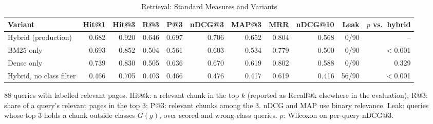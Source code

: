 \begin{table}[t]
\centering
\caption{Retrieval: Standard Measures and Variants}
\label{tab:retrieval-measures}
\footnotesize
\begin{tabular}{@{}lrrrrrrrrrr@{}}
\toprule
Variant & Hit@1 & Hit@3 & R@3 & P@3 & nDCG@3 & MAP@3 & MRR & nDCG@10 & Leak & $p$ vs.\ hybrid \\
\midrule
Hybrid (production) & 0.682 & 0.920 & 0.646 & 0.697 & 0.706 & 0.652 & 0.804 & 0.568 & 0/90 & -- \\
BM25 only & 0.693 & 0.852 & 0.504 & 0.561 & 0.603 & 0.534 & 0.779 & 0.500 & 0/90 & $<$0.001 \\
Dense only & 0.739 & 0.830 & 0.505 & 0.636 & 0.670 & 0.619 & 0.802 & 0.588 & 0/90 & 0.329 \\
Hybrid, no class filter & 0.466 & 0.705 & 0.403 & 0.466 & 0.476 & 0.417 & 0.619 & 0.416 & 56/90 & $<$0.001 \\
\bottomrule
\end{tabular}
\par\smallskip\parbox{\linewidth}{\scriptsize 88 queries with labelled relevant pages. Hit@k: a relevant chunk in the top $k$ (reported as Recall@k elsewhere in the evaluation); R@3: share of a query's relevant pages in the top 3; P@3: relevant chunks among the 3. nDCG and MAP use binary relevance. Leak: queries whose top 3 holds a chunk outside classes $G(g)$, over scored and wrong-class queries. $p$: Wilcoxon on per-query nDCG@3.}
\end{table}

